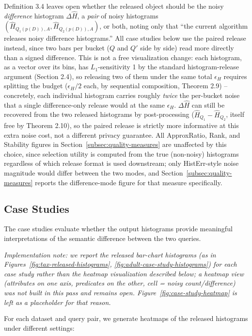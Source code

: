 Definition 3.4 leaves open whether the released object should be the
noisy \emph{difference} histogram $\Delta\hat H$, a \emph{pair} of noisy
histograms $(\hat H_{Q_1(p(D)),A}, \hat H_{Q_2(p(D)),A})$, or both,
noting only that ``the current algorithm releases noisy difference
histograms.'' All case studies below use the paired release instead,
since two bars per bucket ($Q$ and $Q'$ side by side) read more directly
than a signed difference. This is not a free visualization change: each
histogram, as a vector over its bins, has $L_1$-sensitivity 1 by the
standard histogram-release argument (Section 2.4), so releasing two of
them under the same total $\epsilon_H$ requires splitting the budget
($\epsilon_H/2$ each, by sequential composition, Theorem 2.9) --
concretely, each individual histogram carries roughly \emph{twice} the
per-bucket noise that a single difference-only release would at the same
$\epsilon_H$. $\Delta\hat H$ can still be recovered from the two released
histograms by post-processing ($\hat H_{Q_1}-\hat H_{Q_2}$, itself free by
Theorem 2.10), so the paired release is strictly more informative at this
extra noise cost, not a different privacy guarantee. All ApproxRatio,
Rank, and Stability figures in Section~\ref{subsec:quality-measures} are
unaffected by this choice, since selection utility is computed from the
true (non-noisy) histograms regardless of which release format is used
downstream; only HistErr-style noise magnitude would differ between the
two modes, and Section~\ref{subsec:quality-measures} reports the
difference-mode figure for that measure specifically.

\subsection{Case Studies}
\label{subsec:case-studies}

The case studies evaluate whether the output histograms provide meaningful
interpretations of the semantic difference between the two queries.

\textit{Implementation note: we report the released bar-chart histograms
(as in Figures~\ref{fig:tax-released-histograms},
\ref{fig:adult-case-study-histograms}) for each case study rather than the
heatmap visualization described below; a heatmap view (attributes on one
axis, predicates on the other, cell = noisy count/difference) was not
built in this pass and remains open. Figure~\ref{fig:case-study-heatmap}
is left as a placeholder for that reason.}

For each dataset and query pair, we generate heatmaps of the released histograms
under different settings:

